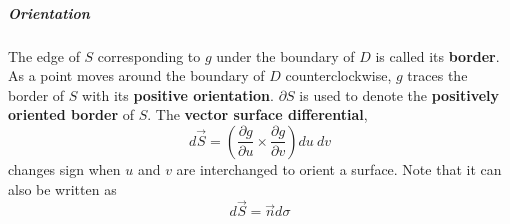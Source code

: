 \documentclass[11pt]{article}
\begin{document}
	\subparagraph{Orientation} The edge of $S$ corresponding to $g$ under the boundary of $D$ is called its \textbf{border}. As a point moves around the boundary of $D$ counterclockwise, $g$ traces the border of $S$ with its \textbf{positive orientation}. $\partial S$ is used to denote the \textbf{positively oriented border} of $S$. The \textbf{vector surface differential},
		\begin{equation}
			d\vec{S} = \left( \frac{\partial g}{\partial u} \times \frac{\partial g}{\partial v} \right) du\ dv
		\end{equation}
		changes sign when $u$ and $v$ are interchanged to orient a surface. Note that it can also be written as
		\begin{equation}
			d\vec{S} = \vec{n} d\sigma
		\end{equation}
%		
%		


\end{document}
